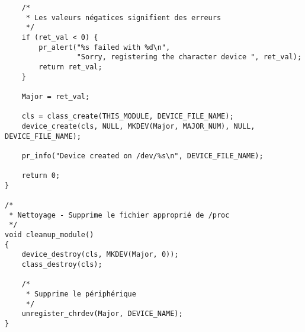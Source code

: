 \documentclass[11pt]{article}
\begin{document}
\begin{verbatim}
    /*
     * Les valeurs négatices signifient des erreurs
     */
    if (ret_val < 0) {
        pr_alert("%s failed with %d\n",
                 "Sorry, registering the character device ", ret_val);
        return ret_val;
    }

    Major = ret_val;

    cls = class_create(THIS_MODULE, DEVICE_FILE_NAME);
    device_create(cls, NULL, MKDEV(Major, MAJOR_NUM), NULL, DEVICE_FILE_NAME);

    pr_info("Device created on /dev/%s\n", DEVICE_FILE_NAME);

    return 0;
}

/*
 * Nettoyage - Supprime le fichier approprié de /proc
 */
void cleanup_module()
{
    device_destroy(cls, MKDEV(Major, 0));
    class_destroy(cls);

    /*
     * Supprime le périphérique
     */
    unregister_chrdev(Major, DEVICE_NAME);
}
\end{verbatim}
\end{document}
